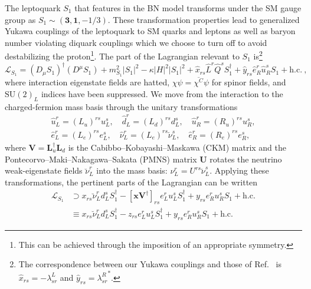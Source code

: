 The leptoquark $S_{1}$ that features in the BN model transforms under the SM
gauge group as $S_{1} \sim (\mathbf{3}, \mathbf{1}, -1/3)$. These transformation
properties lead to generalized Yukawa couplings of the leptoquark to SM quarks
and leptons as well as baryon number violating diquark couplings which we choose
to turn off to avoid destabilizing the proton\footnote{This can be achieved
  through the imposition of an appropriate symmetry.}. The part of the
Lagrangian relevant to $S_{1}$ is\footnote{The correspondence between our Yukawa
  couplings and those of Ref.~\cite{Bauer:2015knc} is
  $\hat{x}_{rs} = -\lambda^L_{sr}$ and $\hat{y}_{rs} = {\lambda^R_{sr}}^{*}$.}
\begin{equation}
  \label{eq:ch3-Lagra}
  \mathscr{L}_{S_{1}} = (D_\mu S_{1})^\dagger (D^\mu S_{1}) + m_{S_1}^2 |S_{1}|^2 - \kappa |H|^2 |S_{1}|^2 + \hat{x}_{rs} \hat{L}^r \hat{Q}^s S_{1}^\dagger
  + \hat{y}_{rs} \hat{e}_R^r \hat{u}_R^s S_{1} + \text{h.c.} \ ,
\end{equation}
where interaction eigenstate fields are hatted,
$\chi \psi = \overline{\chi^C} \psi$ for spinor fields, and $\mathrm{SU}(2)_L$
indices have been suppressed. We move from the interaction to the
charged-fermion mass basis through the unitary transformations
\begin{equation}
  \begin{split}
    \hat{u}_L^r = (L_u)^{rs} u_L^s, \quad \hat{d}_L^r = (L_d)^{rs} d_L^s, \quad \hat{u}^r_R = (R_u)^{rs} u^s_R,\\
    \hat{e}_L^r = (L_e)^{rs} e_L^s, \quad \hat{\nu}_L^r = (L_e)^{rs} \breve{\nu}_L^s, \quad \hat{e}_R^r = (R_e)^{rs} e_R^s,
  \end{split}
\end{equation}
where $\mathbf{V} = \mathbf{L}_u^\dagger \mathbf{L}_d$ is the
Cabibbo--Kobayashi--Maskawa (CKM) matrix and the
Pontecorvo--Maki--Nakagawa--Sakata (PMNS) matrix $\mathbf{U}$ rotates the
neutrino weak-eigenstate fields $\breve{\nu}_L^r$ into the mass basis: $\nu_L^r
= U^{rs} \breve{\nu}_L^s$. Applying these transformations, the pertinent parts
of the Lagrangian can be written
\begin{equation}
  \begin{split}
    \label{eq:ch3-Lagray}
    \mathscr{L}_{S_{1}} &\supset x_{rs} \breve{\nu}_L^r d_L^s S_{1}^\dagger - [\mathbf{x} \mathbf{V}^\dagger]_{rs} e_L^r u_L^s S_{1}^\dagger + y_{rs} e_R^r u_R^s S_{1} + \text{h.c.}\\
    &\equiv x_{rs} \breve{\nu}_L^r d_L^s S_{1}^\dagger - z_{rs} e_L^r u_L^s S_{1}^\dagger + y_{rs}
    e_R^r u_R^s S_{1} + \text{h.c.}
  \end{split}
\end{equation}
